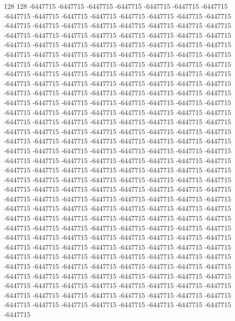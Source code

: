 128 128
-6447715 -6447715 -6447715 -6447715 -6447715 -6447715 -6447715 -6447715 -6447715 -6447715 -6447715 -6447715 -6447715 -6447715 -6447715 -6447715 -6447715 -6447715 -6447715 -6447715 -6447715 -6447715 -6447715 -6447715 -6447715 -6447715 -6447715 -6447715 -6447715 -6447715 -6447715 -6447715 -6447715 -6447715 -6447715 -6447715 -6447715 -6447715 -6447715 -6447715 -6447715 -6447715 -6447715 -6447715 -6447715 -6447715 -6447715 -6447715 -6447715 -6447715 -6447715 -6447715 -6447715 -6447715 -6447715 -6447715 -6447715 -6447715 -6447715 -6447715 -6447715 -6447715 -6447715 -6447715 -6447715 -6447715 -6447715 -6447715 -6447715 -6447715 -6447715 -6447715 -6447715 -6447715 -6447715 -6447715 -6447715 -6447715 -6447715 -6447715 -6447715 -6447715 -6447715 -6447715 -6447715 -6447715 -6447715 -6447715 -6447715 -6447715 -6447715 -6447715 -6447715 -6447715 -6447715 -6447715 -6447715 -6447715 -6447715 -6447715 -6447715 -6447715 -6447715 -6447715 -6447715 -6447715 -6447715 -6447715 -6447715 -6447715 -6447715 -6447715 -6447715 -6447715 -6447715 -6447715 -6447715 -6447715 -6447715 -6447715 -6447715 -6447715 -6447715 -6447715 -6447715 -6447715 -6447715 -6447715
-6447715 -6447715 -6447715 -6447715 -6447715 -6447715 -6447715 -6447715 -6447715 -6447715 -6447715 -6447715 -6447715 -6447715 -6447715 -6447715 -6447715 -6447715 -6447715 -6447715 -6447715 -6447715 -6447715 -6447715 -6447715 -6447715 -6447715 -6447715 -6447715 -6447715 -6447715 -6447715 -6447715 -6447715 -6447715 -6447715 -6447715 -6447715 -6447715 -6447715 -6447715 -6447715 -6447715 -6447715 -6447715 -6447715 -6447715 -6447715 -6447715 -6447715 -6447715 -6447715 -6447715 -6447715 -6447715 -6447715 -6447715 -6447715 -6447715 -6447715 -6447715 -6447715 -6447715 -6447715 -6447715 -6447715 -6447715 -6447715 -6447715 -6447715 -6447715 -6447715 -6447715 -6447715 -6447715 -6447715 -6447715 -6447715 -6447715 -6447715 -6447715 -6447715 -6447715 -6447715 -6447715 -6447715 -6447715 -6447715 -6447715 -6447715 -6447715 -6447715 -6447715 -6447715 -6447715 -6447715 -6447715 -6447715 -6447715 -6447715 -6447715 -6447715 -6447715 -6447715 -6447715 -6447715 -6447715 -6447715 -6447715 -6447715 -6447715 -6447715 -6447715 -6447715 -6447715 -6447715 -6447715 -6447715 -6447715 -6447715 -6447715 -6447715 -6447715 -6447715 -6447715 -6447715 -6447715 -6447715
